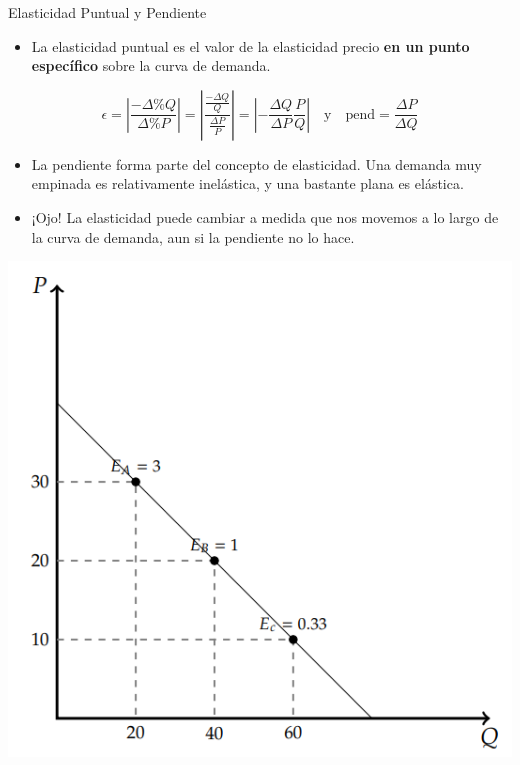 \documentclass{beamer}
\begin{document}
\begin{frame}{Elasticidad Puntual y Pendiente}
    \begin{itemize}
        \item La elasticidad puntual es el valor de la elasticidad precio \textbf{en un punto específico} sobre la curva de demanda.
    \end{itemize}
  \begin{footnotesize}
    \begin{equation*}
      \epsilon = \left|\frac{- \Delta \% Q}{\Delta \% P}\right| = \left|\frac{\frac{- \Delta Q}{Q}}{\frac{\Delta P}{P}}\right| = \left|-\frac{\Delta Q}{\Delta P} \frac{P}{Q}\right|\,\,\,\,\,\,\text{y}\,\,\,\,\,\, \text{pend} = \frac{\Delta P}{\Delta Q}
    \end{equation*}
    
  \end{footnotesize}
  \begin{itemize}
    
    \item La pendiente forma parte del concepto de elasticidad. Una demanda muy empinada es relativamente inelástica, y una bastante plana es elástica.
    \item ¡Ojo! La elasticidad puede cambiar a medida que nos movemos a lo largo de la curva de demanda, aun si la pendiente no lo hace.
  \end{itemize}
    \centering
    \includegraphics[scale=0.35]{../Figures/C16.7.png}
\end{frame}
\end{document}
